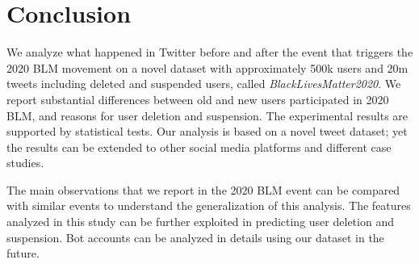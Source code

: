 \documentclass[sigconf]{acmart}
\begin{document}
\section{Conclusion}
We analyze what happened in Twitter before and after the event that triggers the 2020 BLM movement on a novel dataset with approximately 500k users and 20m tweets including deleted and suspended users, called \emph{BlackLivesMatter2020}. We report substantial differences between old and new users participated in 2020 BLM, and reasons for user deletion and suspension. The experimental results are supported by statistical tests. Our analysis is based on a novel tweet dataset; yet the results can be extended to other social media platforms and different case studies. 

The main observations that we report in the 2020 BLM event can be compared with similar events to understand the generalization of this analysis. The features analyzed in this study can be further exploited in predicting user deletion and suspension. Bot accounts can be analyzed in details using our dataset in the future.



\end{document}
